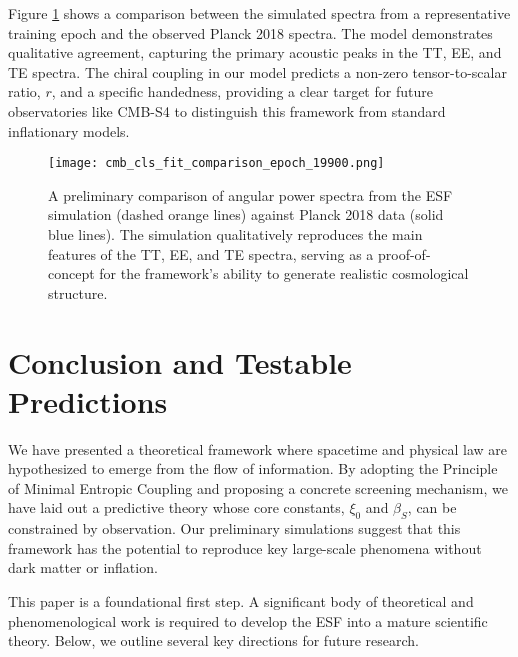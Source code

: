 \documentclass[12pt, a4paper]{article}
\begin{document}
Figure \ref{fig:cmb_cls_fit} shows a comparison between the simulated spectra from a representative training epoch and the observed Planck 2018 spectra. The model demonstrates qualitative agreement, capturing the primary acoustic peaks in the TT, EE, and TE spectra. The chiral coupling in our model predicts a non-zero tensor-to-scalar ratio, \(r\), and a specific handedness, providing a clear target for future observatories like CMB-S4 to distinguish this framework from standard inflationary models.

\begin{figure}[ht!]
    \centering
    \texttt{[image: cmb\_cls\_fit\_comparison\_epoch\_19900.png]}
    \caption{A preliminary comparison of angular power spectra from the ESF simulation (dashed orange lines) against Planck 2018 data (solid blue lines). The simulation qualitatively reproduces the main features of the TT, EE, and TE spectra, serving as a proof-of-concept for the framework's ability to generate realistic cosmological structure.}
    \label{fig:cmb_cls_fit}
\end{figure}

\section{Conclusion and Testable Predictions}
\label{sec:conclusion}

We have presented a theoretical framework where spacetime and physical law are hypothesized to emerge from the flow of information. By adopting the Principle of Minimal Entropic Coupling and proposing a concrete screening mechanism, we have laid out a predictive theory whose core constants, \(\xi_0\) and \(\beta_S\), can be constrained by observation. Our preliminary simulations suggest that this framework has the potential to reproduce key large-scale phenomena without dark matter or inflation.

This paper is a foundational first step. A significant body of theoretical and phenomenological work is required to develop the ESF into a mature scientific theory. Below, we outline several key directions for future research.
\end{document}
